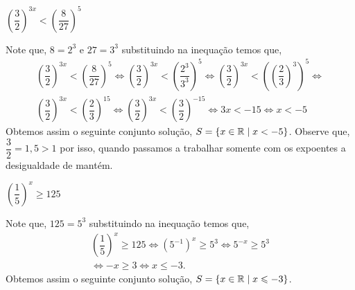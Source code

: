   \begin{exem}
  $\left( \dfrac{3}{2} \right)^{3x} < \left( \dfrac{8}{27} \right)^5$
  
  Note que, $8= 2^3$ e $27= 3^3$ substituindo na inequação temos que,
  \begin{eqnarray*}
  \left( \dfrac{3}{2} \right)^{3x} < \left( \dfrac{8}{27} \right)^5 \Leftrightarrow
  \left( \dfrac{3}{2} \right)^{3x} < \left( \dfrac{2^3}{3^3} \right)^5 \Leftrightarrow
  \left( \dfrac{3}{2} \right)^{3x} < \left(\left( \dfrac{2}{3}\right)^3 \right)^5 \Leftrightarrow \\
  \left( \dfrac{3}{2} \right)^{3x} < \left(\dfrac{2}{3} \right)^{15} \Leftrightarrow
  \left( \dfrac{3}{2} \right)^{3x} < \left(\dfrac{3}{2} \right)^{-15} \Leftrightarrow
   3x < -15 \Leftrightarrow x < -5
  \end{eqnarray*}
  Obtemos assim o seguinte conjunto solução, $S= \{x \in \mathbb{R} \mid x < -5 \}$.
  Observe que, $\dfrac{3}{2}= 1,5 > 1$ por isso, quando passamos a trabalhar somente com os expoentes a desigualdade de mantém.
  \end{exem}
  
  \begin{exem}
  $\left( \dfrac{1}{5} \right)^x \geq 125$
  
  Note que, $125= 5^3$ substituindo na inequação temos que,
  \begin{eqnarray*}
  \left( \dfrac{1}{5} \right)^x \geq 125 \Leftrightarrow
  \left( 5^{-1} \right)^x \geq 5^3 \Leftrightarrow
  5^{-x} \geq 5^3 \\
  \Leftrightarrow -x \geq 3 \Leftrightarrow x \leq -3.
  \end{eqnarray*}
  Obtemos assim o seguinte conjunto solução, $S= \{x \in \mathbb{R} \mid x \leqslant -3 \}$.
  \end{exem}
  
  
  
  

